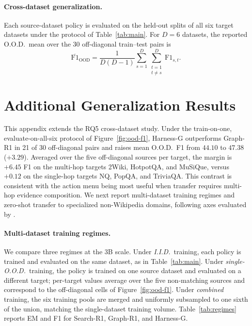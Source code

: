 \documentclass[letterpaper]{article} %
\begin{document}
\paragraph{Cross-dataset generalization.}
Each source-dataset policy is evaluated on the held-out splits of all six target datasets under the protocol of Table~\ref{tab:main}.
For $D{=}6$ datasets, the reported O.O.D.\ mean over the 30 off-diagonal train--test pairs is
\begin{equation}
\overline{\mathrm{F1}}_{\mathrm{OOD}}
=\frac{1}{D(D-1)}\sum_{s=1}^{D}\sum_{\substack{t=1\\t\neq s}}^{D}\mathrm{F1}_{s,t}.
\end{equation}

\section{Additional Generalization Results}
\label{app:gen}

This appendix extends the RQ5 cross-dataset study.
Under the train-on-one, evaluate-on-all-six protocol of Figure~\ref{fig:ood-f1}, Harness-G outperforms Graph-R1 in 21 of 30 off-diagonal pairs and raises mean O.O.D.\ F1 from $44.10$ to $47.38$ ($+3.29$).
Averaged over the five off-diagonal sources per target, the margin is $+6.45$ F1 on the multi-hop targets 2Wiki, HotpotQA, and MuSiQue, versus $+0.12$ on the single-hop targets NQ, PopQA, and TriviaQA.
This contrast is consistent with the action menu being most useful when transfer requires multi-hop evidence composition.
We next report multi-dataset training regimes and zero-shot transfer to specialized non-Wikipedia domains, following axes evaluated by \citet{luo2025graphr1}.

\paragraph{Multi-dataset training regimes.}
We compare three regimes at the 3B scale.
Under \emph{I.I.D.}\ training, each policy is trained and evaluated on the same dataset, as in Table~\ref{tab:main}.
Under \emph{single-O.O.D.}\ training, the policy is trained on one source dataset and evaluated on a different target; per-target values average over the five non-matching sources and correspond to the off-diagonal cells of Figure~\ref{fig:ood-f1}.
Under \emph{combined} training, the six training pools are merged and uniformly subsampled to one sixth of the union, matching the single-dataset training volume.
Table~\ref{tab:regimes} reports EM and F1 for Search-R1, Graph-R1, and Harness-G.
\end{document}
